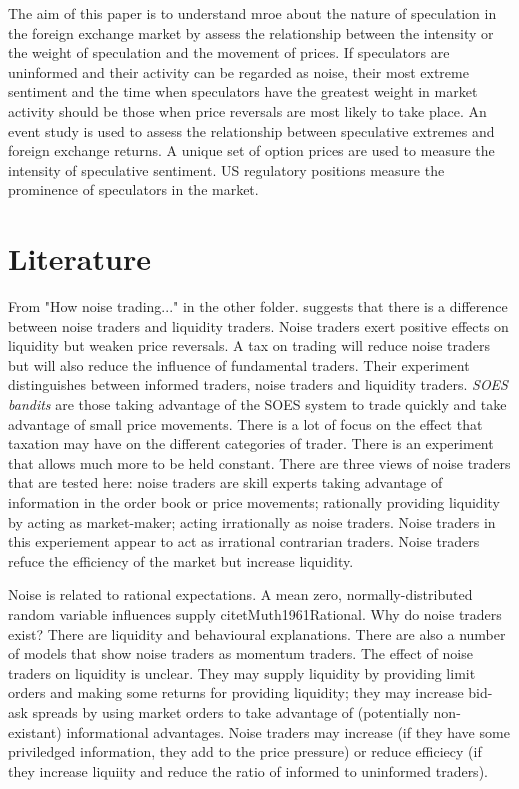 \documentclass[12pt, a4paper, oneside]{article} %
\begin{document}
The aim of this paper is to understand mroe about the nature of speculation in the foreign exchange market by assess the relationship between the intensity or the weight of speculation and the movement of prices.  If speculators are uninformed and their activity can be regarded as noise, their most extreme sentiment and the time when speculators have the greatest weight in market activity should be those when price reversals are most likely to take place.  An event study is used to assess the relationship between speculative extremes and foreign exchange returns.  A unique set of option prices are used to measure the intensity of speculative sentiment.  US regulatory positions measure the prominence of speculators in the market.  

\section{Literature}
From "How noise trading..." in the other folder. 
\citet{bloomfield2009noise} suggests that there is a difference between noise traders and liquidity traders.  Noise traders exert positive effects on liquidity but weaken price reversals. A tax on trading will reduce noise traders but will also reduce the influence of fundamental traders. Their experiment distinguishes between informed traders, noise traders and liquidity traders.  \emph{SOES bandits} are those taking advantage of the SOES system to trade quickly and take advantage of small price movements. There is a lot of focus on the effect that taxation may have on the different categories of trader. There is an experiment that allows much more to be held constant. There are three views of noise traders that are tested here:  noise traders are skill experts taking advantage of information in the order book or price movements;  rationally providing liquidity by acting as market-maker; acting irrationally as noise traders. Noise traders in this experiement appear to act as irrational contrarian traders. Noise traders refuce the efficiency of the market but increase liquidity. 

Noise is related to rational expectations.  A mean zero, normally-distributed random variable influences supply citet{Muth1961Rational}.  Why do noise traders exist?  There are liquidity and behavioural explanations. There are also a number of models that show noise traders as momentum traders. The effect of noise traders on liquidity is unclear. They may supply liquidity by providing limit orders and making some returns for providing liquidity; they may increase bid-ask spreads by using market orders to take advantage of (potentially non-existant) informational advantages. Noise traders may increase (if they have some priviledged information, they add to the price pressure) or reduce efficiecy (if they increase liquiity and reduce the ratio of informed to uninformed traders). 
\end{document}
